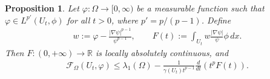 \documentclass[11pt,leqno]{amsart}
\newtheorem{proposition}{Proposition}[section]
\numberwithin{equation}{section}
\begin{document}
\begin{proposition}\label{prop4.2}
Let $\varphi : \Omega \to [0, \infty)$ be a measurable function such that $\varphi \in L^{p'}(U_t,\phi )$ for all $t > 0$, where $p'=p/(p-1)$. Define
\begin{align*}
w := \varphi - \frac{|\nabla \psi|^{p-1}}{\psi^{p-1}},
\qquad
F(t) := \int_{U_t} w \frac{|\nabla \psi|}{\psi} \phi \, dx.
\end{align*}
Then $F : (0,+\infty) \to \mathbb{R}$ is locally absolutely continuous, and
\begin{align}\label{ineqaulity about lambda}
    \mathcal{F}_{\Omega}(U_t, \varphi) \leq \lambda_1(\Omega) - \frac{1}{\gamma (U_t) t^{p-1}} \frac{d}{dt} \left( t^p F(t) \right). 
\end{align}
\end{proposition}
\end{document}
